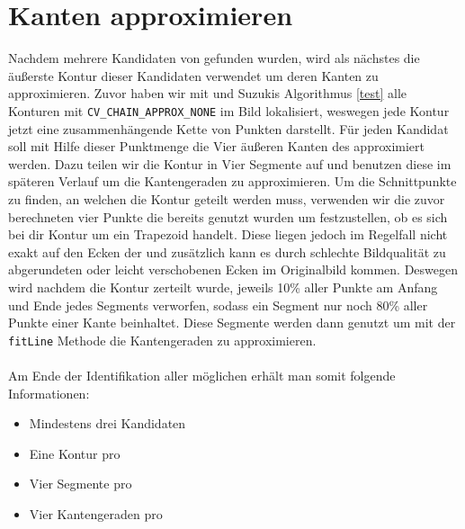 \section{Kanten approximieren}
Nachdem mehrere Kandidaten von \fps gefunden wurden, wird als nächstes die äußerste Kontur dieser Kandidaten verwendet um deren Kanten zu approximieren. Zuvor haben wir mit \OpenCV und Suzukis Algorithmus \ref{test}  alle Konturen mit \texttt{CV\_CHAIN\_APPROX\_NONE} im Bild lokalisiert, weswegen jede Kontur jetzt eine zusammenhängende Kette von Punkten darstellt. Für jeden Kandidat soll mit Hilfe dieser Punktmenge die Vier äußeren Kanten des \fps approximiert werden. Dazu teilen wir die Kontur in Vier Segmente auf und benutzen diese im späteren Verlauf um die Kantengeraden zu approximieren. Um die Schnittpunkte zu finden, an welchen die Kontur geteilt werden muss, verwenden wir die zuvor berechneten vier Punkte die bereits genutzt wurden um festzustellen, ob es sich bei dir Kontur um ein Trapezoid handelt. Diese liegen jedoch im Regelfall nicht exakt auf den Ecken der \fps und zusätzlich kann es durch schlechte Bildqualität zu abgerundeten oder leicht verschobenen Ecken im Originalbild kommen. Deswegen wird nachdem die Kontur zerteilt wurde, jeweils 10\% aller Punkte am Anfang und Ende jedes Segments verworfen, sodass ein Segment nur noch 80\% aller Punkte einer Kante beinhaltet. Diese Segmente werden dann genutzt um mit der \texttt{fitLine} Methode die Kantengeraden zu approximieren. 
\\\\
Am Ende der Identifikation aller möglichen \fps erhält man somit folgende Informationen:
\begin{itemize}
	\item Mindestens drei \fp Kandidaten
	\item Eine Kontur pro \fp
	\item Vier Segmente pro \fp
	\item Vier Kantengeraden pro \fp
\end{itemize}